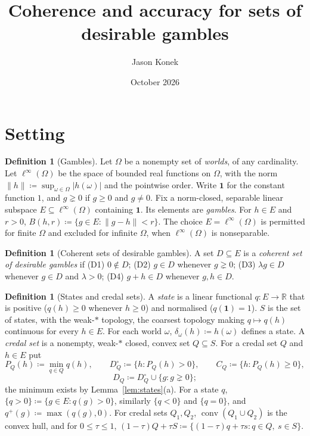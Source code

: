 \documentclass[11pt]{article}
\title{Coherence and accuracy for sets of desirable gambles}
\author{Jason Konek}
\date{October 2026}
\theoremstyle{definition}
\newtheorem{definition}[theorem]{Definition}
\newcommand{\R}{\mathbb R}
\newcommand{\one}{\mathbf 1}
\DeclareMathOperator{\conv}{conv}
\begin{document}
\maketitle

\section{Setting}\label{sec:setting}

\begin{definition}[Gambles]\label{def:gambles}
Let $\Omega$ be a nonempty set of \emph{worlds}, of any cardinality. Let $\ell^\infty(\Omega)$ be the space of bounded real functions on $\Omega$, with the norm $\|h\|\coloneqq\sup_{\omega\in\Omega}|h(\omega)|$ and the pointwise order. Write $\one$ for the constant function $1$, and $g\gneq0$ if $g\ge0$ and $g\ne0$. Fix a norm-closed, separable linear subspace $E\subseteq\ell^\infty(\Omega)$ containing $\one$. Its elements are \emph{gambles}. For $h\in E$ and $r>0$, $B(h,r)\coloneqq\{g\in E:\|g-h\|<r\}$. The choice $E=\ell^\infty(\Omega)$ is permitted for finite $\Omega$ and excluded for infinite $\Omega$, when $\ell^\infty(\Omega)$ is nonseparable.
\end{definition}

\begin{definition}[Coherent sets of desirable gambles]\label{def:coherence}
A set $D\subseteq E$ is a \emph{coherent set of desirable gambles} if
(D1) $0\notin D$;
(D2) $g\in D$ whenever $g\gneq0$;
(D3) $\lambda g\in D$ whenever $g\in D$ and $\lambda>0$;
(D4) $g+h\in D$ whenever $g,h\in D$.
\end{definition}

\begin{definition}[States and credal sets]\label{def:states}
A \emph{state} is a linear functional $q:E\to\R$ that is positive ($q(h)\ge0$ whenever $h\ge0$) and normalised ($q(\one)=1$). $S$ is the set of states, with the weak-$\ast$ topology, the coarsest topology making $q\mapsto q(h)$ continuous for every $h\in E$. For each world $\omega$, $\delta_\omega(h)\coloneqq h(\omega)$ defines a state. A \emph{credal set} is a nonempty, weak-$\ast$ closed, convex set $Q\subseteq S$. For a credal set $Q$ and $h\in E$ put
\[
P_Q(h)\coloneqq\min_{q\in Q}q(h),\qquad D^\circ_Q\coloneqq\{h:P_Q(h)>0\},\qquad C_Q\coloneqq\{h:P_Q(h)\ge0\},
\]
\[
D_Q\coloneqq D^\circ_Q\cup\{g:g\gneq0\};
\]
the minimum exists by Lemma~\ref{lem:states}(a). For a state $q$, $\{q>0\}\coloneqq\{g\in E:q(g)>0\}$, similarly $\{q<0\}$ and $\{q=0\}$, and $q^+(g)\coloneqq\max(q(g),0)$. For credal sets $Q_1,Q_2$, $\conv(Q_1\cup Q_2)$ is the convex hull, and for $0\le\tau\le1$, $(1-\tau)Q+\tau S\coloneqq\{(1-\tau)q+\tau s:q\in Q,\ s\in S\}$.
\end{definition}
\end{document}
